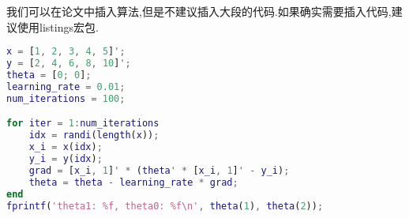 
\appendix
\chapter{}
我们可以在论文中插入算法,但是不建议插入大段的代码.如果确实需要插入代码,建议使用listings宏包.
\begin{lstlisting}[language=MATLAB]
x = [1, 2, 3, 4, 5]';
y = [2, 4, 6, 8, 10]';
theta = [0; 0];
learning_rate = 0.01;
num_iterations = 100;

for iter = 1:num_iterations
    idx = randi(length(x));
    x_i = x(idx);
    y_i = y(idx);
    grad = [x_i, 1]' * (theta' * [x_i, 1]' - y_i);
    theta = theta - learning_rate * grad;
end
fprintf('theta1: %f, theta0: %f\n', theta(1), theta(2));
\end{lstlisting}